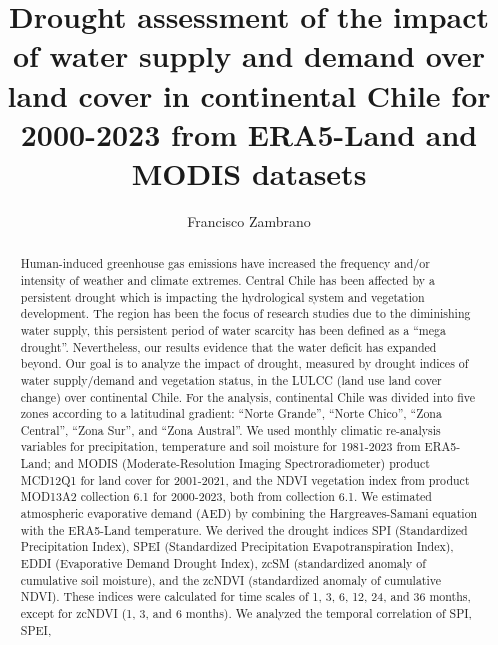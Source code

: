 \documentclass[
  number,
  preprint,
  3p]{elsarticle}
\begin{document}
\begin{frontmatter}
\title{Drought assessment of the impact of water supply and demand over
land cover in continental Chile for 2000-2023 from ERA5-Land and MODIS
datasets}
\author[1]{Francisco Zambrano%
%
}


        
\begin{abstract}
Human-induced greenhouse gas emissions have increased the frequency
and/or intensity of weather and climate extremes. Central Chile has been
affected by a persistent drought which is impacting the hydrological
system and vegetation development. The region has been the focus of
research studies due to the diminishing water supply, this persistent
period of water scarcity has been defined as a ``mega drought''.
Nevertheless, our results evidence that the water deficit has expanded
beyond. Our goal is to analyze the impact of drought, measured by
drought indices of water supply/demand and vegetation status, in the
LULCC (land use land cover change) over continental Chile. For the
analysis, continental Chile was divided into five zones according to a
latitudinal gradient: ``Norte Grande'', ``Norte Chico'', ``Zona
Central'', ``Zona Sur'', and ``Zona Austral''. We used monthly climatic
re-analysis variables for precipitation, temperature and soil moisture
for 1981-2023 from ERA5-Land; and MODIS (Moderate-Resolution Imaging
Spectroradiometer) product MCD12Q1 for land cover for 2001-2021, and the
NDVI vegetation index from product MOD13A2 collection 6.1 for 2000-2023,
both from collection 6.1. We estimated atmospheric evaporative demand
(AED) by combining the Hargreaves-Samani equation with the ERA5-Land
temperature. We derived the drought indices SPI (Standardized
Precipitation Index), SPEI (Standardized Precipitation
Evapotranspiration Index), EDDI (Evaporative Demand Drought Index), zcSM
(standardized anomaly of cumulative soil moisture), and the zcNDVI
(standardized anomaly of cumulative NDVI). These indices were calculated
for time scales of 1, 3, 6, 12, 24, and 36 months, except for zcNDVI (1,
3, and 6 months). We analyzed the temporal correlation of SPI, SPEI,

\end{abstract}
\end{frontmatter}
\end{document}
